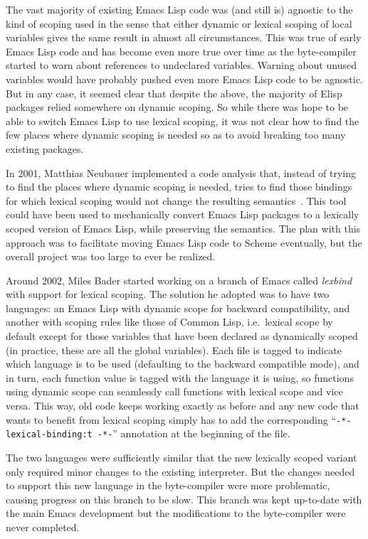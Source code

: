 \documentclass[format=acmsmall, review]{acmart}
\newcommand \Elisp {Emacs Lisp}
\begin{document}
The vast majority of existing \Elisp{} code was (and still is) agnostic to
the kind of scoping used in the sense that either dynamic or lexical scoping
of local variables gives the same result in almost all circumstances.  This was true of early
\Elisp{} code and has become even more true over time as the byte-compiler
started to warn about references to undeclared variables.  Warning about
unused variables would have probably pushed even more \Elisp{} code to be
agnostic.  But in any case, it seemed clear that despite the above, the
majority of Elisp packages relied somewhere on dynamic scoping.  So while
there was hope to be able to switch \Elisp{} to use lexical scoping, it was
not clear how to find the few places where dynamic scoping is needed so as
to avoid breaking too many existing packages.

In 2001, Matthias Neubauer implemented a code
analysis that, instead of trying to find the places where dynamic scoping is
needed, tries to find those bindings for which lexical scoping would not
change the resulting semantics~\cite{Neubauer01}.
This tool could have been used to
mechanically convert \Elisp{} packages to a lexically scoped version of
\Elisp{}, while preserving the semantics.  The plan with this approach
was to facilitate moving \Elisp{} code to Scheme eventually, but the
overall project was too large to ever be realized.

Around 2002, Miles Bader started working on a branch of Emacs called
\emph{lexbind} with support for lexical scoping.  The solution he adopted was to have two languages: an
\Elisp{} with dynamic scope for backward compatibility, and another with
scoping rules like those of Common Lisp, i.e.~lexical scope by default
except for those variables that have been declared as dynamically scoped (in
practice, these are all the global variables).  Each file is tagged to
indicate which language is to be used (defaulting to the backward compatible
mode), and in turn, each function value is tagged with the language it is
using, so functions using dynamic scope can seamlessly call functions with
lexical scope and vice versa.  This way, old code keeps working exactly
as before and any new code that wants to benefit from lexical scoping
simply has to add the corresponding ``\texttt{-*- lexical-binding:t -*-}''
annotation at the beginning of the file.

The two languages were sufficiently similar that the new lexically scoped
variant only required minor changes to the existing interpreter.  But the
changes needed to support this new language in the byte-compiler were more
problematic, causing progress on this branch to be slow.  This branch was
kept up-to-date with the main Emacs development but the modifications to the
byte-compiler were never completed.
\end{document}
